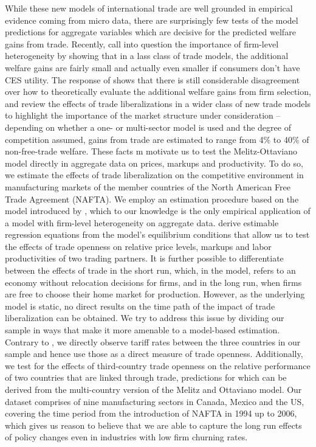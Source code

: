 While these new models of international trade are well grounded in empirical evidence coming from micro data, there are surprisingly few tests of the model predictions for aggregate variables which are decisive for the predicted welfare gains from trade. Recently, \citet{Arkolakisetal2012a,Arkolakisetal2012b} call into question the importance of firm-level heterogeneity by showing that in a lass class of trade models, the additional welfare gains are fairly small and actually even smaller if consumers don't have CES utility. The response of \citet{MelitzRedding2013} shows that there is still considerable disagreement over how to theoretically evaluate the additional welfare gains from firm selection, and \citet{CostinotRodriguez2014} review the effects of trade liberalizations in a wider class of new trade models to highlight the importance of the market structure under consideration -- depending on whether a one- or multi-sector model is used and the degree of competition assumed, gains from trade are estimated to range from 4\% to 40\% of non-free-trade welfare. These facts m motivate us to test the Melitz-Ottaviano model directly in aggregate data on prices, markups and productivity. To do so, we estimate the effects of trade liberalization on the competitive environment in manufacturing markets of the member countries of the North American Free Trade Agreement (NAFTA). We employ an estimation procedure based on the \citet{MelitzOttaviano2008} model introduced by \citet{Chen2009}, which to our knowledge is the only empirical application of a model with firm-level heterogeneity on aggregate data. \citet{Chen2009} derive estimable regression equations from the model's equilibrium conditions that allow us to test the effects of trade openness on relative price levels, markups and labor productivities of two trading partners. It is further possible to differentiate between the effects of trade in the short run, which, in the model, refers to an economy without relocation decisions for firms, and in the long run, when firms are free to choose their home market for production. However, as the underlying model is static, no direct results on the time path of the impact of trade liberalization can be obtained. We try to address this issue by dividing our sample in ways that make it more amenable to a model-based estimation. Contrary to \citet{Chen2009}, we directly observe tariff rates between the three countries in our sample and hence use those as a direct measure of trade openness. Additionally, we test for the effects of third-country trade openness on the relative performance of two countries that are linked through trade, predictions for which can be derived from the multi-country version of the Melitz and Ottaviano model. Our dataset comprises of nine manufacturing sectors in Canada, Mexico and the US, covering the time period from the introduction of NAFTA in 1994 up to 2006, which gives us reason to believe that we are able to capture the long run effects of policy changes even in industries with low firm churning rates. \\

